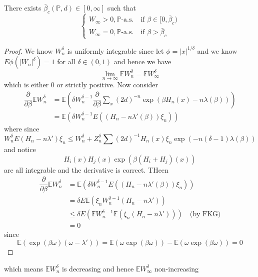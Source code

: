 \begin{proposition}
    There exists $\bar{\beta}_c(\mathbb{P},d) \in [0,\infty]$ such that
    \[
    \begin{cases}
        W_{\infty} > 0, \mathbb{P}\text{-a.s.}\quad\text{if }\beta\in[0,\bar{\beta}_c) \\
        W_{\infty} = 0, \mathbb{P}\text{-a.s.}\quad\text{if }\beta>\bar{\beta}_c
    \end{cases}
    \]
\end{proposition}
\begin{proof}
    We know $W_n^{\delta}$ is uniformly integrable since let $\phi = |x|^{1/\delta}$ and we know $E\phi(|W_n|^\delta) = 1$ for all $\delta \in (0,1)$ and hence we have
    \[
    \lim\limits_{n\to\infty} \mathbb{E}W_n^{\delta} = \mathbb{E}W_{\infty}^{\delta}
    \]
    which is either $0$ or strictly positive. Now consider
    \[
    \begin{aligned}
        \dfrac{\partial}{\partial \beta} \mathbb{E}W_{n}^{\delta} & = \mathbb{E}(\delta W_n^{\delta-1} \dfrac{\partial}{\partial \beta} \sum\limits_{x} (2d)^{-n} \exp{(\beta H_n(x) - n\lambda(\beta))})\\
        & = \mathbb{E}(\delta W_n^{\delta-1}E((H_n-n\lambda'(\beta))\xi_n))
    \end{aligned}
    \]
    where since
    \[
    W_n^{\delta}E(H_n-n\lambda')\xi_n \leq W_n^{\delta} + Z_n^{\delta}\sum(2d)^{-1} H_n(x)\xi_n \exp(-n(\delta-1)\lambda(\beta))
    \]
    and notice
    \[
    H_i(x)H_j(x)\exp(\beta(H_i+H_j)(x))
    \]
    are all integrable and the derivative is correct. THeen
    \[
     \begin{aligned}
        \dfrac{\partial}{\partial \beta} \mathbb{E}W_{n}^{\delta} 
        & = \mathbb{E}(\delta W_n^{\delta-1}E((H_n-n\lambda'(\beta))\xi_n))
        \\
        & = \delta E\mathbb{E}(\xi_n W_n^{\delta - 1}(H_n-n\lambda')) \\
        &\leq \delta E(\mathbb{E}W_n^{\delta-1} \mathbb{E}(\xi_n(H_n - n\lambda')))\quad\text{(by FKG)}\\
        &=0
    \end{aligned}
    \]
    since
    \[
    \mathbb{E}(\exp(\beta\omega)(\omega - \lambda')) = \mathbb{E}(\omega\exp(\beta\omega)) - \mathbb{E}(\omega\exp(\beta\omega)) = 0
    \]
\end{proof}
which means $\mathbb{E}W_n^{\delta}$ is decreasing and hence $\mathbb{E}W_{\infty}^{\delta}$ non-increasing

